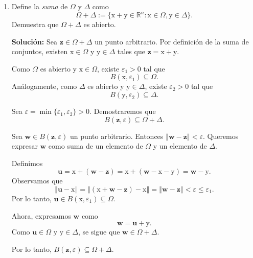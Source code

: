 \documentclass[12pt]{article}
\newcommand{\norm}[1]{\left\Vert#1\right\Vert}
\newcommand{\R}{\mathbb R}
\newcommand{\x}{\mathrm x}
\newcommand{\y}{\mathrm y}
\begin{document}
\begin{enumerate}
\begin{enumerate}[(1)]
\textbf{Tercera propiedad:} $\partial \Omega\subset \partial \Delta$.

Esta propiedad es \textbf{falsa} en general.

\textit{Contraejemplo:} Tomemos $\Omega = [0,1]$ y $\Delta = [0,2]$ en $\R$. Claramente, $\Omega \subset \Delta$. Calculamos las fronteras:
\[
\partial \Omega = \partial([0,1]) = \{0, 1\},
\]
\[
\partial \Delta = \partial([0,2]) = \{0, 2\}.
\]
Observamos que $1 \in \partial \Omega$, pero $1 \notin \partial \Delta$. Por lo tanto, $\partial \Omega \not\subseteq \partial \Delta$, y la propiedad es falsa.
\end{enumerate}

\item Define la \emph{suma} de $\Omega$ y $\Delta$ como
\[ \Omega + \Delta := \{ \x+\y\in \R^n : \x\in \Omega, \y\in \Delta \}. \]
Demuestra que $\Omega + \Delta$ es abierto.

\textbf{Solución: } 
Sea $\mathbf{z} \in \Omega + \Delta$ un punto arbitrario. Por definición de la suma de conjuntos, existen $\x \in \Omega$ y $\y \in \Delta$ tales que $\mathbf{z} = \x + \y$.

Como $\Omega$ es abierto y $\x \in \Omega$, existe $\varepsilon_1 > 0$ tal que
\[
B(\x, \varepsilon_1) \subseteq \Omega.
\]
Análogamente, como $\Delta$ es abierto y $\y \in \Delta$, existe $\varepsilon_2 > 0$ tal que
\[
B(\y, \varepsilon_2) \subseteq \Delta.
\]

Sea $\varepsilon = \min\{\varepsilon_1, \varepsilon_2\} > 0$. Demostraremos que
\[
B(\mathbf{z}, \varepsilon) \subseteq \Omega + \Delta.
\]

Sea $\mathbf{w} \in B(\mathbf{z}, \varepsilon)$ un punto arbitrario. Entonces $\norm{\mathbf{w} - \mathbf{z}} < \varepsilon$. Queremos expresar $\mathbf{w}$ como suma de un elemento de $\Omega$ y un elemento de $\Delta$.

Definimos
\[
\mathbf{u} = \x + (\mathbf{w} - \mathbf{z}) = \x + (\mathbf{w} - \x - \y) = \mathbf{w} - \y.
\]
Observamos que
\[
\norm{\mathbf{u} - \x} = \norm{(\x + \mathbf{w} - \mathbf{z}) - \x} = \norm{\mathbf{w} - \mathbf{z}} < \varepsilon \leq \varepsilon_1.
\]
Por lo tanto, $\mathbf{u} \in B(\x, \varepsilon_1) \subseteq \Omega$.

Ahora, expresamos $\mathbf{w}$ como
\[
\mathbf{w} = \mathbf{u} + \y.
\]
Como $\mathbf{u} \in \Omega$ y $\y \in \Delta$, se sigue que $\mathbf{w} \in \Omega + \Delta$.

Por lo tanto, $B(\mathbf{z}, \varepsilon) \subseteq \Omega + \Delta$.


\end{enumerate}
\end{document}
